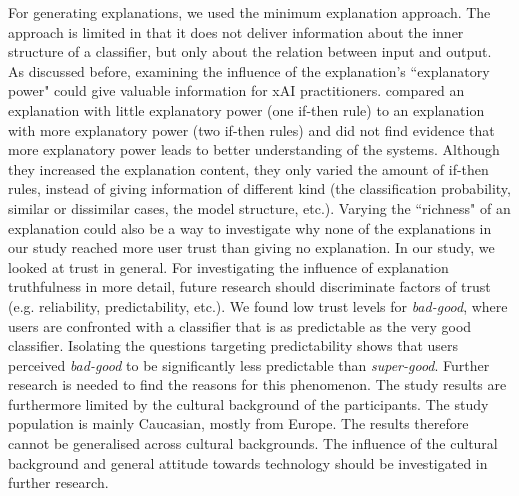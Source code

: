 For generating explanations, we used the minimum explanation approach. The approach is limited in that it does not deliver information about the inner structure of a classifier, but only about the relation between input and output. As discussed before, examining the influence of the explanation's ``explanatory power" could give valuable information for xAI practitioners. \cite{ribeiro2018anchors} compared an explanation with little explanatory power (one if-then rule) to an explanation with more explanatory power (two if-then rules) and did not find evidence that more explanatory power leads to better understanding of the systems. Although they increased the explanation content, they only varied the amount of if-then rules, instead of giving information of different kind (the classification probability, similar or dissimilar cases, the model structure, etc.). Varying the ``richness" of an explanation could also be a way to investigate why none of the explanations in our study reached more user trust than giving no explanation.\newline
In our study, we looked at trust in general. For investigating the influence of explanation truthfulness in more detail, future research should discriminate factors of trust (e.g. reliability, predictability, etc.). We found low trust levels for \textit{bad-good}, where users are confronted with a classifier that is as predictable as the very good classifier. Isolating the questions targeting predictability shows that users perceived \textit{bad-good} to be significantly less predictable than \textit{super-good}. Further research is needed to find the reasons for this phenomenon.\newline
The study results are furthermore limited by the cultural background of the participants. The study population is mainly Caucasian, mostly from Europe. The results therefore cannot be generalised across cultural backgrounds. The influence of the cultural background and general attitude towards technology should be investigated in further research.
